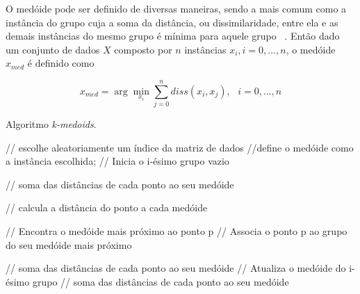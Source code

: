 O medóide pode ser definido de diversas maneiras, sendo a mais comum como a instância do grupo cuja a soma da distância, ou dissimilaridade, entre ela e as demais instâncias do  mesmo grupo é mínima para aquele grupo ~\parencite[][253]{Ullman}. Então dado um conjunto de dados $X$ composto por $n$ instâncias $x_i, i=0,...,n$, o medóide $x_{med}$ é definido como

\begin{equation}
x_{med} = \arg \min_{x_i} \sum_{j=0}^{n} diss(x_i,x_j), \text{			}i=0,...,n
\end{equation}

\begin{algorithm}
	\caption{Algoritmo \emph{k-medoids}.}
	\label{alg:k_medoids}
	\begin{algorithmic}[1]
		
		 // escolhe aleatoriamente um índice da matriz de dados
		 //define o medóide como a instância escolhida;
		 // Inicia o i-ésimo grupo vazio
		\ENDFOR
		
		\STATE{$\phi \leftarrow \epsilon $}	// soma das distâncias de cada ponto ao seu medóide
		
		\WHILE{$\phi \geq \epsilon$}	
		 // calcula a distância do ponto a cada medóide
		\ENDFOR
		
			// Encontra o medóide mais próximo ao ponto p
		 // Associa o ponto p ao grupo do seu medóide mais próximo			
		\ENDFOR
		
			// soma das distâncias de cada ponto ao seu medóide
		 // Atualiza o medóide do i-ésimo grupo
			// soma das distâncias de cada ponto ao seu medóide
		\ENDIF
		\ENDFOR
		\ENDFOR
		
		\ENDWHILE
		
	\end{algorithmic}
\end{algorithm}


